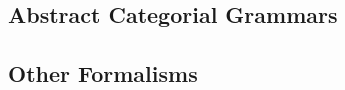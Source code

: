 

\subsection{Abstract Categorial Grammars}

\subsection{Other Formalisms}

\nocite{sorensen2006lectures}
\nocite{martin1982constructive}





